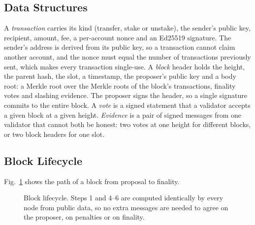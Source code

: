 \documentclass[conference]{IEEEtran}
\begin{document}
\subsection{Data Structures}
A \emph{transaction} carries its kind (transfer, stake or unstake), the sender's public key, recipient, amount, fee, a per-account nonce and an Ed25519 signature. The sender's address is derived from its public key, so a transaction cannot claim another account, and the nonce must equal the number of transactions previously sent, which makes every transaction single-use. A \emph{block} header holds the height, the parent hash, the slot, a timestamp, the proposer's public key and a body root: a Merkle root over the Merkle roots of the block's transactions, finality votes and slashing evidence. The proposer signs the header, so a single signature commits to the entire block. A \emph{vote} is a signed statement that a validator accepts a given block at a given height. \emph{Evidence} is a pair of signed messages from one validator that cannot both be honest: two votes at one height for different blocks, or two block headers for one slot.

\subsection{Block Lifecycle}
Fig.~\ref{fig:lifecycle} shows the path of a block from proposal to finality.

\begin{figure}[t]
\centering
{}
\caption{Block lifecycle. Steps 1 and 4--6 are computed identically by every node from public data, so no extra messages are needed to agree on the proposer, on penalties or on finality.}
\label{fig:lifecycle}
\end{figure}
\end{document}
